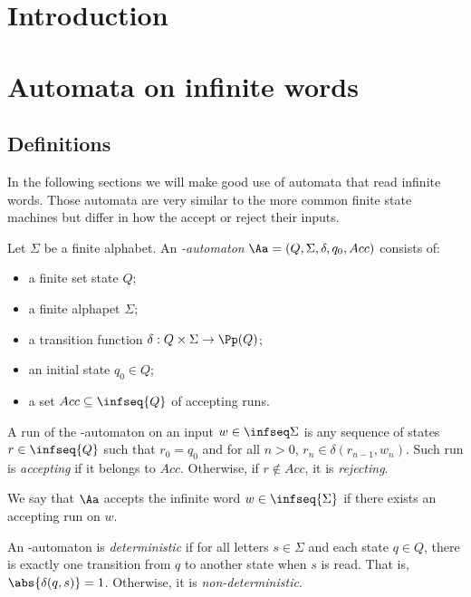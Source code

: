 \maketitle

\tableofcontents
{}
\thispagestyle{empty}
\newpage

\setcounter{section}{-1}
\section{Introduction}
\section{Automata on infinite words}
\subsection{Definitions}

In the following sections
we will make good use of automata that read infinite words.
Those automata are very similar to the more common
finite state machines but differ in how the accept
or reject their inputs.

\begin{definition}
    Let $\Sigma$ be a finite alphabet.
    An \emph{\w-automaton} $\Aa = (Q, \Sigma, \delta, q_0, Acc)$
    consists of:
    \begin{itemize}
        \item a finite set state $Q$;
        \item a finite alphapet $\Sigma$;
        \item a transition function $\delta : Q \times \Sigma \to \Pp(Q)$;
        \item an initial state $q_0 \in Q$;
        \item a set $Acc \subseteq \infseq{Q}$ of accepting runs.
    \end{itemize}

    A run of the \w-automaton on an input $w \in \infseq\Sigma$
    is any sequence of states $r \in \infseq{Q}$ such that
    $r_0 = q_0$ and for all $n > 0$, $r_n \in \delta(r_{n-1}, w_n)$.
    Such run is \emph{accepting} if it belongs to $Acc$.
    Otherwise, if $r \notin Acc$, it is \emph{rejecting}.

    We say that $\Aa$ accepts the infinite word $w \in \infseq{\Sigma}$
    if there exists an accepting run on $w$.

    An \w-automaton is \emph{deterministic} if for all
    letters $s \in \Sigma$ and each state $q \in Q$,
    there is exactly one transition from $q$ to another state
    when $s$ is read. That is, $\abs{\delta(q, s)} = 1$.
    Otherwise, it is \emph{non-deterministic}.

\end{definition}

